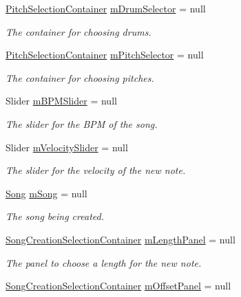 \begin{DoxyCompactItemize}
\hyperlink{class_song_creation_1_1_pitch_selection_container}{Pitch\+Selection\+Container} \hyperlink{group___s_c_priv_var_ga3f1c71d8cabe505745220d728c6f97bc}{m\+Drum\+Selector} = null
\begin{DoxyCompactList}\small\item\em The container for choosing drums. \end{DoxyCompactList}\item 
\hyperlink{class_song_creation_1_1_pitch_selection_container}{Pitch\+Selection\+Container} \hyperlink{group___s_c_priv_var_gac32e68713b2b504807f52acef445df1c}{m\+Pitch\+Selector} = null
\begin{DoxyCompactList}\small\item\em The container for choosing pitches. \end{DoxyCompactList}\item 
Slider \hyperlink{group___s_c_priv_var_ga6f751fe7fc31196eeec490cdbc679baa}{m\+B\+P\+M\+Slider} = null
\begin{DoxyCompactList}\small\item\em The slider for the B\+PM of the song. \end{DoxyCompactList}\item 
Slider \hyperlink{group___s_c_priv_var_ga0738678367556ebb69df6e73213f616d}{m\+Velocity\+Slider} = null
\begin{DoxyCompactList}\small\item\em The slider for the velocity of the new note. \end{DoxyCompactList}\item 
\hyperlink{class_song}{Song} \hyperlink{group___s_c_priv_var_ga9554e9b3758d1cc1e841a5f7d8aa9f56}{m\+Song} = null
\begin{DoxyCompactList}\small\item\em The song being created. \end{DoxyCompactList}\item 
\hyperlink{class_song_creation_1_1_song_creation_selection_container}{Song\+Creation\+Selection\+Container} \hyperlink{group___s_c_priv_var_ga370237b50bc11a581fc963cdd8ffd4ea}{m\+Length\+Panel} = null
\begin{DoxyCompactList}\small\item\em The panel to choose a length for the new note. \end{DoxyCompactList}\item 
\hyperlink{class_song_creation_1_1_song_creation_selection_container}{Song\+Creation\+Selection\+Container} \hyperlink{group___s_c_priv_var_gafeeda8ab122f574c6fff94814234334c}{m\+Offset\+Panel} = null

\end{DoxyCompactItemize}
